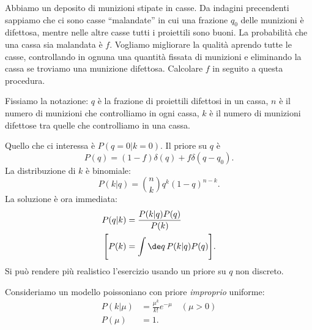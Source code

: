 \begin{exercise}
	Abbiamo un deposito di munizioni stipate in casse.
	Da indagini precendenti sappiamo che ci sono casse ``malandate''
	in cui una frazione $q_0$ delle munizioni è difettosa,
	mentre nelle altre casse tutti i proiettili sono buoni.
	La probabilità che una cassa sia malandata è $f$.
	Vogliamo migliorare la qualità aprendo tutte le casse,
	controllando in ognuna una quantità fissata di munizioni e
	eliminando la cassa se troviamo una munizione difettosa.
	Calcolare $f$ in seguito a questa procedura.
\end{exercise}

\begin{solution*}
	Fissiamo la notazione:
	$q$ è la frazione di proiettili difettosi in un cassa,
	$n$ è il numero di munizioni che controlliamo in ogni cassa,
	$k$ è il numero di munizioni difettose tra quelle che controlliamo in una cassa.
	
	Quello che ci interessa è $P(q=0|k=0)$.
	Il priore su $q$ è
	\begin{equation*}
		P(q) = (1-f) \delta(q) + f \delta(q-q_0).
	\end{equation*}
	La distribuzione di $k$ è binomiale:
	\begin{equation*}
		P(k|q) = \binom nk q^k (1-q)^{n-k}.
	\end{equation*}
	La soluzione è ora immediata:
	\begin{align*}
		P(q|k) &= \frac{P(k|q) P(q)}{P(k)} \\
		\Bigg[ P(k) &= \int \de q\, P(k|q) P(q) \Bigg].
	\end{align*}
	Si può rendere più realistico l'esercizio usando un priore su $q$ non discreto.
\end{solution*}


\begin{example}
	Consideriamo un modello poissoniano con priore \emph{improprio} uniforme:
	\begin{align*}
		P(k|\mu) &= \frac{\mu^k}{k!}e^{-\mu} \quad (\mu > 0) \\
		P(\mu) &= 1.
	\end{align*}
	
\end{example}
